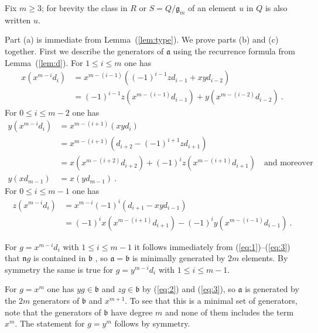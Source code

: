 \documentclass{amsart}
\theoremstyle{bfupright head,upright body}
\theoremstyle{fixed bf head,slanted body}
\theoremstyle{fixed bf head,upright body}
\theoremstyle{numbered paragraph}
\newenvironment{prf*}[1][Proof]{%
  \begin{proof}[\bf #1]
    \setcounter{equation}{0}
    \renewcommand{\theequation}{\arabic{equation}}}
  {\end{proof}
}
\renewcommand{\eqref}[1]{\pgref{eq:#1}}
\newcommand{\pgref}[1]{(\ref{#1})}
\newcommand{\lemref}[2][Lemma~]{#1\pgref{lem:#2}}
\newcommand{\qtext}[1]{\quad\text{#1}\quad}
\newcommand{\n}{\mathfrak{n}}
\newcommand{\fa}{\mathfrak{a}}
\newcommand{\fb}{\mathfrak{b}}
\newcommand{\fg}{\mathfrak{g}}
\numberwithin{equation}{res}
\begin{document}
\begin{prf*}
  Fix $m\ge 3$; for brevity the class in $R$ or $S=Q/\fg_{m}$ of an
  element $u$ in $Q$ is also written $u$.

  Part (a) is immediate from \lemref{type}.  We prove parts (b) and
  (c) together. First we describe the generators of $\fa$ using the
  recurrence formula from \lemref{d}. For $1 \le i \le m$ one has
  \begin{equation}
    \label{eq:1}
    \begin{aligned}
      x(x^{m-i}d_i) & = x^{m-(i-1)}((-1)^{i-1}zd_{i-1} + xyd_{i-2}) \\
      & = (-1)^{i-1}z(x^{m-(i-1)}d_{i-1}) + y(x^{m-(i-2)}d_{i-2})\:.
    \end{aligned}
  \end{equation}
  For $0 \le i \le m-2$ one has
  \begin{equation}
    \label{eq:2}
    \begin{aligned}
      y(x^{m-i}d_i) & = x^{m-(i+1)}(xyd_i) \\
      &= x^{m-(i+1)}(d_{i+2} - (-1)^{i+1}zd_{i+1}) \\
      &= x(x^{m-(i+2)}d_{i+2}) + (-1)^{i}z(x^{m-(i+1)}d_{i+1}) \qtext{and moreover}\\
      y(xd_{m-1}) & = x(yd_{m-1})\:.
    \end{aligned}
  \end{equation}
  For $0 \le i \le m-1$ one has
  \begin{equation}
    \label{eq:3}
    \begin{aligned}
      z(x^{m-i}d_i) & = x^{m-i}(-1)^i(d_{i+1}-xyd_{i-1}) \\
      &= (-1)^ix(x^{m-(i+1)}d_{i+1}) - (-1)^iy(x^{m-(i-1)}d_{i-1})\:.
    \end{aligned}
  \end{equation}

  For $g=x^{m-i}d_i$ with $1\le i \le m-1$ it follows immediately from
  \eqref{1}--\eqref{3} that $\n g$ is contained in $\fb$ , so $\fa =
  \fb$ is minimally generated by $2m$ elements. By symmetry the same
  is true for $g=y^{m-i}d_i$ with $1\le i \le m-1$.

  For $g=x^m$ one has $yg \in \fb$ and $zg \in \fb$ by \eqref{2} and
  \eqref{3}, so $\fa$ is generated by the $2m$ generators of $\fb$ and
  $x^{m+1}$. To see that this is a minimal set of generators, note
  that the generators of $\fb$ have degree $m$ and none of them
  includes the term $x^m$. The statement for $g=y^m$ follows by
  symmetry.


\end{prf*}
\end{document}
